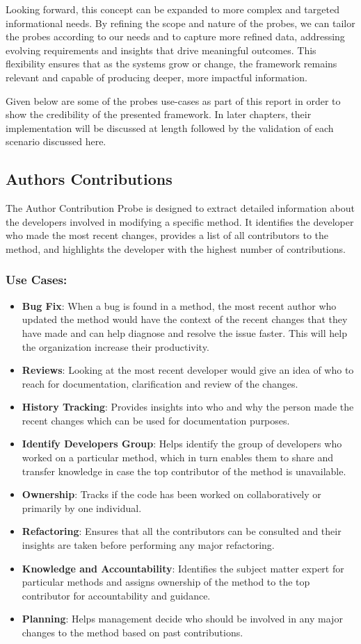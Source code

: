 Looking forward, this concept can be expanded to more complex and targeted informational needs. By refining the scope and nature of the probes, we can tailor the probes according to our needs and to capture more refined data, addressing evolving requirements and insights that drive meaningful outcomes. This flexibility ensures that as the systems grow or change, the framework remains relevant and capable of producing deeper, more impactful information.

Given below are some of the probes use-cases as part of this report in order to show the credibility of the presented framework. In later chapters, their implementation will be discussed at length followed by the validation of each scenario discussed here.

\subsection{Authors Contributions}
The Author Contribution Probe is designed to extract detailed information about the developers involved in modifying a specific method. It identifies the developer who made the most recent changes, provides a list of all contributors to the method, and highlights the developer with the highest number of contributions.
\subsubsection{Use Cases:}
\begin{itemize}[label=$\bullet$]
	\item \textbf{Bug Fix}: When a bug is found in a method, the most recent author who updated the method would have the context of the recent changes that they have made and can help diagnose and resolve the issue faster. This will help the organization increase their productivity.
	\item \textbf{Reviews}: Looking at the most recent developer would give an idea of who to reach for documentation, clarification and review of the changes.
	\item \textbf{History Tracking}: Provides insights into who and why the person made the recent changes which can be used for documentation purposes.
	\item \textbf{Identify Developers Group}: Helps identify the group of developers who worked on a particular method, which in turn enables them to share and transfer knowledge in case the top contributor of the method is unavailable.
	\item \textbf{Ownership}: Tracks if the code has been worked on collaboratively or primarily by one individual.
	\item \textbf{Refactoring}: Ensures that all the contributors can be consulted and their insights are taken before performing any major refactoring.
	\item \textbf{Knowledge and Accountability}: Identifies the subject matter expert for particular methods and assigns ownership of the method to the top contributor for accountability and guidance.
	\item \textbf{Planning}: Helps management decide who should be involved in any major changes to the method based on past contributions.
\end{itemize}
